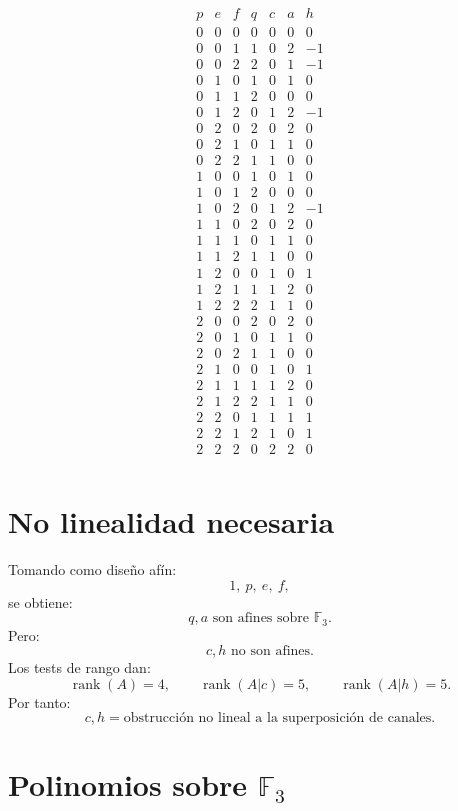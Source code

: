 \documentclass[11pt,a4paper]{article}
\begin{document}
\[
\begin{array}{ccc|rrrr}
p&e&f&q&c&a&h\\
\hline
0&0&0&0&0&0&0\\
0&0&1&1&0&2&-1\\
0&0&2&2&0&1&-1\\
0&1&0&1&0&1&0\\
0&1&1&2&0&0&0\\
0&1&2&0&1&2&-1\\
0&2&0&2&0&2&0\\
0&2&1&0&1&1&0\\
0&2&2&1&1&0&0\\
1&0&0&1&0&1&0\\
1&0&1&2&0&0&0\\
1&0&2&0&1&2&-1\\
1&1&0&2&0&2&0\\
1&1&1&0&1&1&0\\
1&1&2&1&1&0&0\\
1&2&0&0&1&0&1\\
1&2&1&1&1&2&0\\
1&2&2&2&1&1&0\\
2&0&0&2&0&2&0\\
2&0&1&0&1&1&0\\
2&0&2&1&1&0&0\\
2&1&0&0&1&0&1\\
2&1&1&1&1&2&0\\
2&1&2&2&1&1&0\\
2&2&0&1&1&1&1\\
2&2&1&2&1&0&1\\
2&2&2&0&2&2&0\\
\end{array}
\]

\section{No linealidad necesaria}

Tomando como diseño afín:
\[
1,\ p,\ e,\ f,
\]
se obtiene:
\[
q,a\text{ son afines sobre }\mathbb F_3.
\]
Pero:
\[
\boxed{
c,h\text{ no son afines.}
}
\]
Los tests de rango dan:
\[
\operatorname{rank}(A)=4,
\qquad
\operatorname{rank}(A|c)=5,
\qquad
\operatorname{rank}(A|h)=5.
\]
Por tanto:
\[
\boxed{
c,h=\text{obstrucción no lineal a la superposición de canales.}
}
\]

\section{Polinomios sobre \(\mathbb F_3\)}
\end{document}
